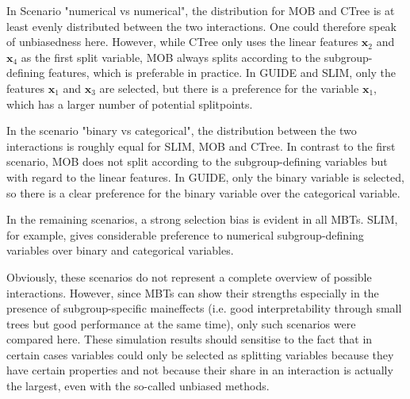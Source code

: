 In Scenario "numerical vs numerical", the distribution for MOB and CTree is at least evenly distributed between the two interactions. One could therefore speak of unbiasedness here. However, while CTree only uses the linear features $\textbf{x}_2$ and $\textbf{x}_4$ as the first split variable, MOB always splits according to the subgroup-defining features, which is preferable in practice.
In GUIDE and SLIM, only the features $\textbf{x}_1$ and $\textbf{x}_3$ are selected, but there is a preference for the variable $\textbf{x}_1$, which has a larger number of potential splitpoints.


In the scenario "binary vs categorical", the distribution between the two interactions is roughly equal for SLIM, MOB and CTree. In contrast to the first scenario, MOB does not split according to the subgroup-defining variables but with regard to the linear features.
In GUIDE, only the binary variable is selected, so there is a clear preference for the binary variable over the categorical variable.

In the remaining scenarios, a strong selection bias is evident in all MBTs. SLIM, for example, gives considerable preference to numerical subgroup-defining variables over binary and categorical variables.





Obviously, these scenarios do not represent a complete overview of possible interactions. However, since MBTs can show their strengths especially in the presence of subgroup-specific maineffects (i.e. good interpretability through small trees but good performance at the same time), only such scenarios were compared here. These simulation results should sensitise to the fact that in certain cases variables could only be selected as splitting variables because they have certain properties and not because their share in an interaction is actually the largest, even with the so-called unbiased methods.









